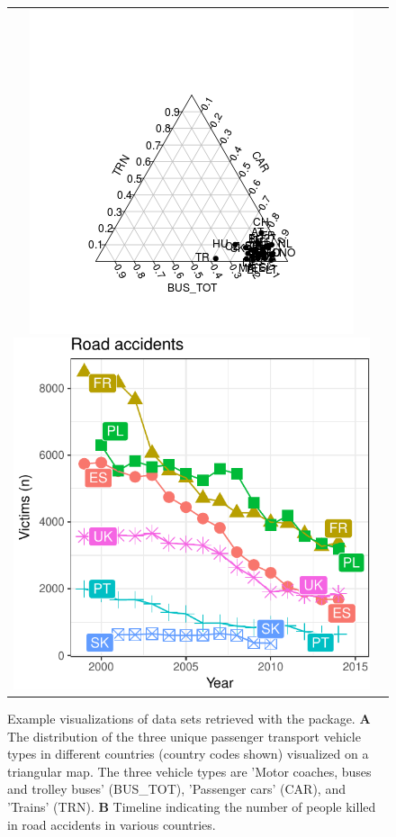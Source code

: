 \begin{figure}
\begin{center}
\begin{tabular}{cc}
\includegraphics{2015-manu-search2b-1}
\includegraphics{2015-manu-roadacc-1}
\end{tabular}
\end{center}
\caption{Example visualizations of data sets retrieved with the  package. {\bf A} The distribution of the three unique passenger transport vehicle types in different countries (country codes shown) visualized on a triangular  map. The three vehicle types are 'Motor coaches, buses and trolley buses' (BUS\_TOT), 'Passenger cars' (CAR), and 'Trains' (TRN). {\bf B} Timeline indicating the number of people killed in road accidents in various countries.}
\label{fig:transport}
\end{figure}


